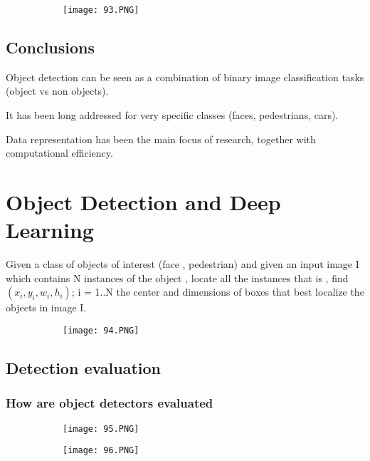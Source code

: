 \documentclass{article}
\begin{document}
\begin{figure}[ht!]
  \centering
  \begin{subfigure}[b]{0.7\linewidth}
    \texttt{[image: 93.PNG]}
  \end{subfigure}
\end{figure}

\subsection{Conclusions}

Object detection can be seen as a combination of binary image classification tasks (object vs non objects).

It has been long addressed for very specific classes (faces, pedestrians, cars).

Data representation has been the main focus of research, together with computational efficiency.

\section{Object Detection and Deep Learning}

Given a class of objects of interest (face , pedestrian) and given an input image I which contains N instances of the object , locate all the instances that is , find ${(x_i,y_i,w_i,h_i)}$; i = 1..N the center and dimensions of boxes that best localize the objects in image I.

\begin{figure}[ht!]
  \centering
  \begin{subfigure}[b]{0.5\linewidth}
    \texttt{[image: 94.PNG]}
  \end{subfigure}
\end{figure}

\subsection{Detection evaluation}

\subsubsection{How are object detectors evaluated}

\begin{figure}[ht!]
  \centering
  \begin{subfigure}[b]{0.6\linewidth}
    \texttt{[image: 95.PNG]}
  \end{subfigure}
     \begin{subfigure}[b]{0.39\textwidth}
         \centering
         \texttt{[image: 96.PNG]}
     \end{subfigure}
\end{figure}
\end{document}
